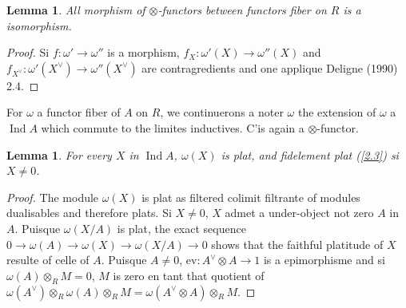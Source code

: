\documentclass[11pt,a4paper]{article}
\theoremstyle{plain}
\newtheorem{lemma}[theorem]{Lemma}
\theoremstyle{definition}
\DeclareMathOperator{\Ind}{Ind}
\newcommand{\ev}{\mathrm{ev}}
\begin{document}
\begin{lemma}\label{3.2}
All morphism of $\otimes$-functors between functors fiber on $R$ is a isomorphism.
\end{lemma}

\begin{proof}
Si $f:\omega'\to\omega''$ is a morphism, $f_X:\omega'(X)\to\omega''(X)$ and $f_{X^\vee}:\omega'(X^\vee)\to\omega''(X^\vee)$ are contragredients and one applique Deligne (1990) 2.4.
\end{proof}

For $\omega$ a functor fiber of $A$ on $R$, we continuerons a noter $\omega$ the extension of $\omega$ a $\Ind A$ which commute to the limites inductives. C'is again a $\otimes$-functor.

\begin{lemma}\label{3.3}
For every $X$ in $\Ind A$, $\omega(X)$ is plat, and fidelement plat (\ref{2.3}) si $X\neq0$.
\end{lemma}

\begin{proof}
The module $\omega(X)$ is plat as filtered colimit filtrante of modules dualisables and therefore plats. Si $X\neq0$, $X$ admet a under-object not zero $A$ in $A$. Puisque $\omega(X/A)$ is plat, the exact sequence $0\to\omega(A)\to\omega(X)\to\omega(X/A)\to0$ shows that the faithful platitude of $X$ resulte of celle of $A$. Puisque $A\neq0$, $\ev:A^\vee\otimes A\to1$ is a epimorphisme and si $\omega(A)\otimes_R M=0$, $M$ is zero en tant that quotient of $\omega(A^\vee)\otimes_R\omega(A)\otimes_R M=\omega(A^\vee\otimes A)\otimes_R M$.
\end{proof}

\subsection{}\label{3.4}
\end{document}
